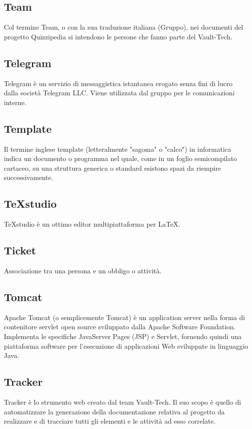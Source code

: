 \subsection{Team}
Col termine Team, o con la sua traduzione italiana (Gruppo), nei documenti del progetto
Quizzipedia si intendono le persone che fanno parte del Vault-Tech.


\subsection{Telegram}
Telegram è un servizio di messaggistica istantanea erogato senza fini di lucro dalla società Telegram LLC. Viene utilizzata dal gruppo per le comunicazioni interne.

\subsection{Template}
Il termine inglese template (letteralmente "sagoma" o "calco") in informatica
indica un documento o programma nel quale, come in un foglio semicompilato
cartaceo, su una struttura generica o standard esistono spazi da riempire
successivamente.

\subsection{TeXstudio}
TeXstudio è un ottimo editor multipiattaforma per LaTeX.

\subsection{Ticket}
Associazione tra una persona e un obbligo o attività.

\subsection{Tomcat}
Apache Tomcat (o semplicemente Tomcat) è un application server nella forma di contenitore servlet open source sviluppato dalla Apache Software Foundation. Implementa le specifiche JavaServer Pages (JSP) e Servlet, fornendo quindi una piattaforma software per l'esecuzione di applicazioni Web sviluppate in linguaggio Java. 

\subsection{Tracker}
Tracker è lo strumento web creato dal team Vault-Tech. Il suo scopo è quello di automatizzare la generazione della documentazione relativa al progetto da realizzare e di tracciare tutti gli elementi e le attività ad esso correlate.

